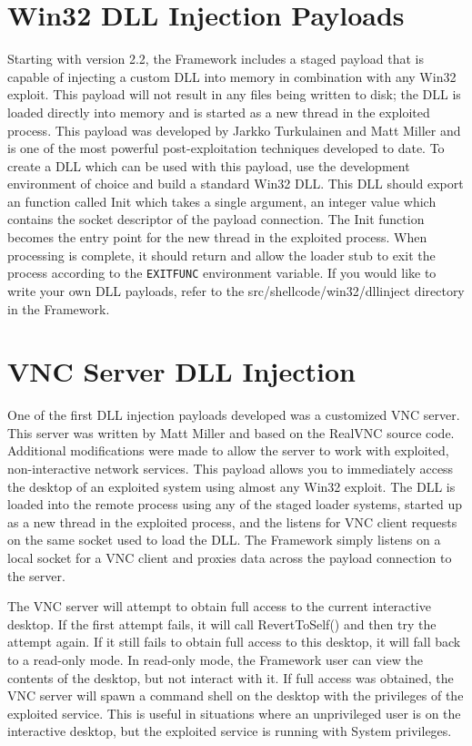 \documentclass{report}
\begin{document}
\section{Win32 DLL Injection Payloads}
\par
Starting with version 2.2, the Framework includes a staged payload that is
capable of injecting a custom DLL into memory in combination with any Win32
exploit. This payload will not result in any files being written to disk; the
DLL is loaded directly into memory and is started as a new thread in the
exploited process. This payload was developed by Jarkko Turkulainen and Matt
Miller and is one of the most powerful post-exploitation techniques developed to
date. To create a DLL which can be used with this payload, use the development
environment of choice and build a standard Win32 DLL. This DLL should export an
function called Init which takes a single argument, an integer value which
contains the socket descriptor of the payload connection. The Init function
becomes the entry point for the new thread in the exploited process. When
processing is complete, it should return and allow the loader stub to exit the
process according to the \texttt{EXITFUNC} environment variable. If you would like to
write your own DLL payloads, refer to the src/shellcode/win32/dllinject
directory in the Framework. 

\section{VNC Server DLL Injection}
\par
One of the first DLL injection payloads developed was a customized VNC server.
This server was written by Matt Miller and based on the RealVNC source code.
Additional modifications were made to allow the server to work with exploited,
non-interactive network services. This payload allows you to immediately access
the desktop of an exploited system using almost any Win32 exploit. The DLL is
loaded into the remote process using any of the staged loader systems, started
up as a new thread in the exploited process, and the listens for VNC client
requests on the same socket used to load the DLL. The Framework simply listens
on a local socket for a VNC client and proxies data across the payload
connection to the server.  

\par
The VNC server will attempt to obtain full access to the current interactive
desktop. If the first attempt fails, it will call RevertToSelf() and then try
the attempt again. If it still fails to obtain full access to this desktop, it
will fall back to a read-only mode. In read-only mode, the Framework user can
view the contents of the desktop, but not interact with it. If full access was
obtained, the VNC server will spawn a command shell on the desktop with the
privileges of the exploited service. This is useful in situations where an
unprivileged user is on the interactive desktop, but the exploited service is
running with System privileges.  
\end{document}
